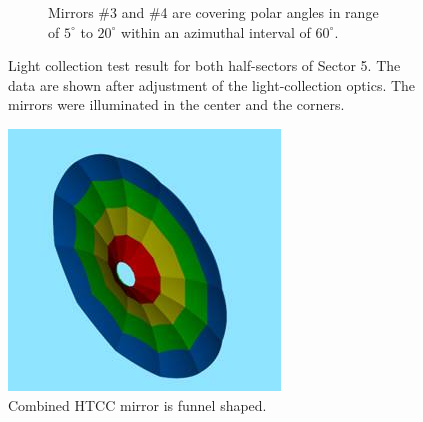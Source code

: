 \begin{figure}
\begin{subfigure}[b]{0.5\textwidth}
    \caption{Mirrors \#3 and \#4 are covering polar angles in range of $5^\circ$ to $20^\circ$  within an azimuthal interval of $60^\circ$.} \label{fig:subfig1_b}
\end{subfigure}
\caption{Light collection test result for both half-sectors of Sector 5. The data are shown after adjustment of the light-collection optics. The mirrors were illuminated in the center and the corners.} 
\label{fig:subfig}
\end{figure}

\begin{figure}[ht]
    \centering
    \includegraphics[width=1.0\linewidth,trim={0 0cm 0 0},clip]{images/Colored_Mirror.jpg}
    \caption{Combined HTCC mirror is funnel shaped.}
    \label{fig:Colored_Mirror}
\end{figure}


